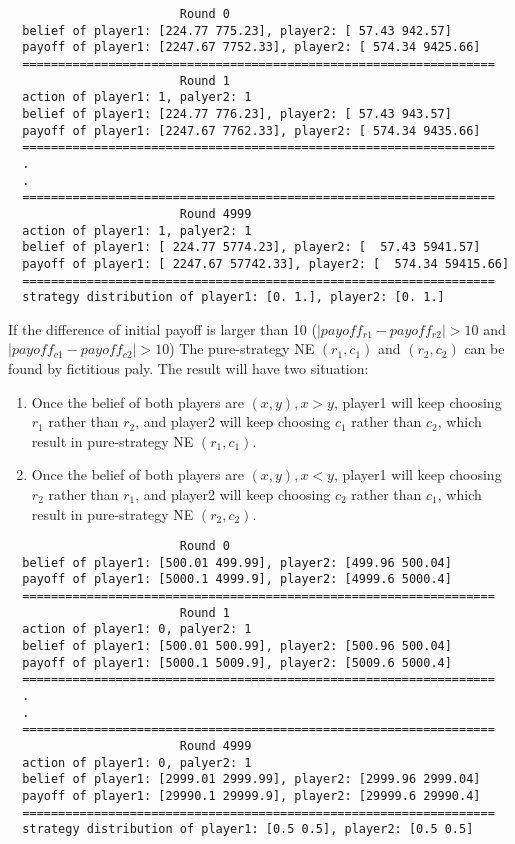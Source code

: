 \documentclass[a4paper, oneside, final, 12pt]{scrartcl} %
\begin{document}
\begin{lstlisting}
                        Round 0
  belief of player1: [224.77 775.23], player2: [ 57.43 942.57]
  payoff of player1: [2247.67 7752.33], player2: [ 574.34 9425.66]
  ==================================================================
                        Round 1
  action of player1: 1, palyer2: 1
  belief of player1: [224.77 776.23], player2: [ 57.43 943.57]
  payoff of player1: [2247.67 7762.33], player2: [ 574.34 9435.66]
  ==================================================================
  .
  .
  ==================================================================
                        Round 4999
  action of player1: 1, palyer2: 1
  belief of player1: [ 224.77 5774.23], player2: [  57.43 5941.57]
  payoff of player1: [ 2247.67 57742.33], player2: [  574.34 59415.66]
  ==================================================================
  strategy distribution of player1: [0. 1.], player2: [0. 1.]
\end{lstlisting}

\begingroup
\raggedright
If the difference of initial payoff is larger than 10 
($|payoff_{r1} - payoff_{r2}| > 10$ and $|payoff_{c1} - payoff_{c2}| > 10$)
The pure-strategy NE $(r_1, c_1)$ and $(r_2, c_2)$ can be found by fictitious paly.
The result will have two situation:

\newpage

\begin{enumerate}
  \item Once the belief of both players are $(x, y), x > y$, 
  player1 will keep choosing $r_1$ rather than $r_2$, 
  and player2 will keep choosing $c_1$ rather than $c_2$, 
  which result in pure-strategy NE $(r_1, c_1)$.
  \item Once the belief of both players are $(x, y), x < y$, 
  player1 will keep choosing $r_2$ rather than $r_1$, 
  and player2 will keep choosing $c_2$ rather than $c_1$, 
  which result in pure-strategy NE $(r_2, c_2)$.
\end{enumerate}

\endgroup

\begin{lstlisting}
                        Round 0
  belief of player1: [500.01 499.99], player2: [499.96 500.04]
  payoff of player1: [5000.1 4999.9], player2: [4999.6 5000.4]
  ==================================================================
                        Round 1
  action of player1: 0, palyer2: 1
  belief of player1: [500.01 500.99], player2: [500.96 500.04]
  payoff of player1: [5000.1 5009.9], player2: [5009.6 5000.4]
  ==================================================================
  .
  .
  ==================================================================
                        Round 4999
  action of player1: 0, palyer2: 1
  belief of player1: [2999.01 2999.99], player2: [2999.96 2999.04]
  payoff of player1: [29990.1 29999.9], player2: [29999.6 29990.4]
  ==================================================================
  strategy distribution of player1: [0.5 0.5], player2: [0.5 0.5]
\end{lstlisting}
\end{document}
